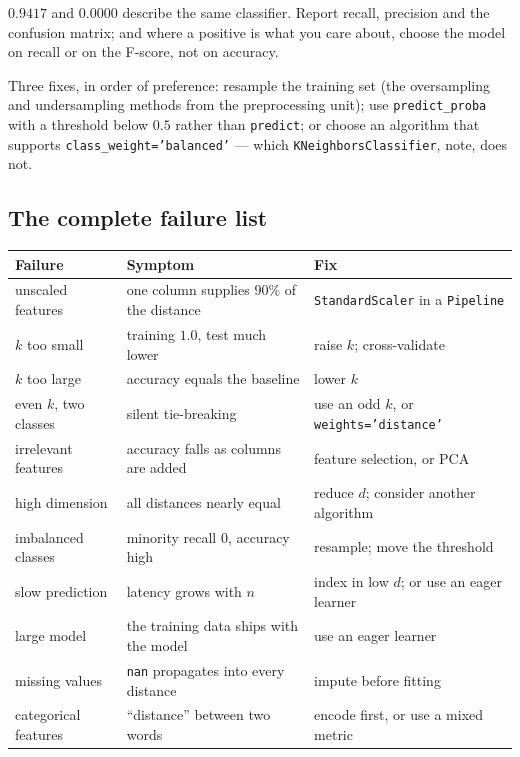 \documentclass[11pt]{article}
\begin{document}
\begin{caution}
$0.9417$ and $0.0000$ describe the same classifier. Report recall, precision
and the confusion matrix; and where a positive is what you care about, choose
the model on recall or on the F-score, not on accuracy.
\end{caution}

Three fixes, in order of preference: resample the training set (the
oversampling and undersampling methods from the preprocessing unit); use
\texttt{predict\_proba} with a threshold below $0.5$ rather than
\texttt{predict}; or choose an algorithm that supports
\texttt{class\_weight='balanced'} --- which \texttt{KNeighborsClassifier}, note,
does not.

\subsection{The complete failure list}

\begin{center}\small
\begin{tabular}{@{}p{4.0cm}p{4.2cm}p{5.2cm}@{}}
\toprule
\textbf{Failure} & \textbf{Symptom} & \textbf{Fix}\\
\midrule
unscaled features & one column supplies $90\%$ of the distance &
  \texttt{StandardScaler} in a \texttt{Pipeline}\\
$k$ too small & training $1.0$, test much lower & raise $k$; cross-validate\\
$k$ too large & accuracy equals the baseline & lower $k$\\
even $k$, two classes & silent tie-breaking & use an odd $k$, or
  \texttt{weights='distance'}\\
irrelevant features & accuracy falls as columns are added &
  feature selection, or PCA\\
high dimension & all distances nearly equal & reduce $d$; consider another
  algorithm\\
imbalanced classes & minority recall $0$, accuracy high & resample; move the
  threshold\\
slow prediction & latency grows with $n$ & index in low $d$; or use an eager
  learner\\
large model & the training data ships with the model & use an eager learner\\
missing values & \texttt{nan} propagates into every distance & impute before
  fitting\\
categorical features & ``distance'' between two words &
  encode first, or use a mixed metric\\
\bottomrule
\end{tabular}
\end{center}
\end{document}

